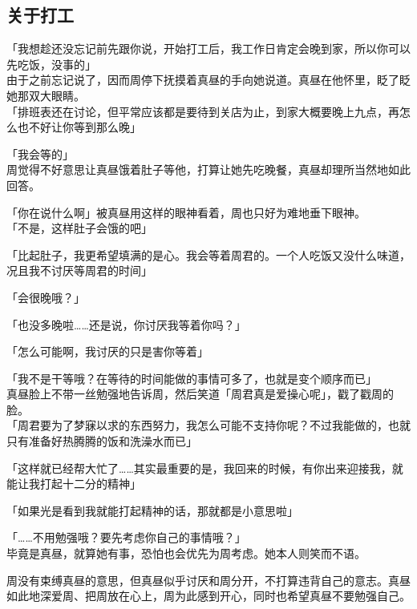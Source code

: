 \subsection{关于打工}

「我想趁还没忘记前先跟你说，开始打工后，我工作日肯定会晚到家，所以你可以先吃饭，没事的」\\

由于之前忘记说了，因而周停下抚摸着真昼的手向她说道。真昼在他怀里，眨了眨她那双大眼睛。\\

「排班表还在讨论，但平常应该都是要待到关店为止，到家大概要晚上九点，再怎么也不好让你等到那么晚」

「我会等的」\\

周觉得不好意思让真昼饿着肚子等他，打算让她先吃晚餐，真昼却理所当然地如此回答。

「你在说什么啊」被真昼用这样的眼神看着，周也只好为难地垂下眼神。\\

「不是，这样肚子会饿的吧」

「比起肚子，我更希望填满的是心。我会等着周君的。一个人吃饭又没什么味道，况且我不讨厌等周君的时间」

「会很晚哦？」

「也没多晚啦……还是说，你讨厌我等着你吗？」

「怎么可能啊，我讨厌的只是害你等着」

「我不是干等哦？在等待的时间能做的事情可多了，也就是变个顺序而已」\\

真昼脸上不带一丝勉强地告诉周，然后笑道「周君真是爱操心呢」，戳了戳周的脸。\\

「周君要为了梦寐以求的东西努力，我怎么可能不支持你呢？不过我能做的，也就只有准备好热腾腾的饭和洗澡水而已」

「这样就已经帮大忙了……其实最重要的是，我回来的时候，有你出来迎接我，就能让我打起十二分的精神」

「如果光是看到我就能打起精神的话，那就都是小意思啦」

「……不用勉强哦？要先考虑你自己的事情哦？」\\

毕竟是真昼，就算她有事，恐怕也会优先为周考虑。她本人则笑而不语。

周没有束缚真昼的意思，但真昼似乎讨厌和周分开，不打算违背自己的意志。真昼如此地深爱周、把周放在心上，周为此感到开心，同时也希望真昼不要勉强自己。\\


